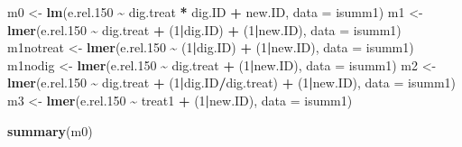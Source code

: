 \documentclass[
]{article}
\newenvironment{Shaded}{\begin{snugshade}}{\end{snugshade}}
\newcommand{\AttributeTok}[1]{\textcolor[rgb]{0.13,0.29,0.53}{#1}}
\newcommand{\DecValTok}[1]{\textcolor[rgb]{0.00,0.00,0.81}{#1}}
\newcommand{\FloatTok}[1]{\textcolor[rgb]{0.00,0.00,0.81}{#1}}
\newcommand{\FunctionTok}[1]{\textcolor[rgb]{0.13,0.29,0.53}{\textbf{#1}}}
\newcommand{\NormalTok}[1]{#1}
\newcommand{\OtherTok}[1]{\textcolor[rgb]{0.56,0.35,0.01}{#1}}
\newcommand{\SpecialCharTok}[1]{\textcolor[rgb]{0.81,0.36,0.00}{\textbf{#1}}}
\begin{document}
\begin{Shaded}
\begin{Highlighting}[]
\NormalTok{m0 }\OtherTok{\textless{}{-}} \FunctionTok{lm}\NormalTok{(e.rel}\FloatTok{.150} \SpecialCharTok{\textasciitilde{}}\NormalTok{ dig.treat }\SpecialCharTok{*}\NormalTok{ dig.ID }\SpecialCharTok{+}\NormalTok{ new.ID, }\AttributeTok{data =}\NormalTok{ isumm1)}
\NormalTok{m1 }\OtherTok{\textless{}{-}} \FunctionTok{lmer}\NormalTok{(e.rel}\FloatTok{.150} \SpecialCharTok{\textasciitilde{}}\NormalTok{ dig.treat }\SpecialCharTok{+}\NormalTok{ (}\DecValTok{1}\SpecialCharTok{|}\NormalTok{dig.ID) }\SpecialCharTok{+}\NormalTok{ (}\DecValTok{1}\SpecialCharTok{|}\NormalTok{new.ID), }\AttributeTok{data =}\NormalTok{ isumm1)}
\NormalTok{m1notreat }\OtherTok{\textless{}{-}} \FunctionTok{lmer}\NormalTok{(e.rel}\FloatTok{.150} \SpecialCharTok{\textasciitilde{}}\NormalTok{ (}\DecValTok{1}\SpecialCharTok{|}\NormalTok{dig.ID) }\SpecialCharTok{+}\NormalTok{ (}\DecValTok{1}\SpecialCharTok{|}\NormalTok{new.ID), }\AttributeTok{data =}\NormalTok{ isumm1)}
\NormalTok{m1nodig }\OtherTok{\textless{}{-}} \FunctionTok{lmer}\NormalTok{(e.rel}\FloatTok{.150} \SpecialCharTok{\textasciitilde{}}\NormalTok{ dig.treat }\SpecialCharTok{+}\NormalTok{ (}\DecValTok{1}\SpecialCharTok{|}\NormalTok{new.ID), }\AttributeTok{data =}\NormalTok{ isumm1)}
\NormalTok{m2 }\OtherTok{\textless{}{-}} \FunctionTok{lmer}\NormalTok{(e.rel}\FloatTok{.150} \SpecialCharTok{\textasciitilde{}}\NormalTok{ dig.treat }\SpecialCharTok{+}\NormalTok{ (}\DecValTok{1}\SpecialCharTok{|}\NormalTok{dig.ID}\SpecialCharTok{/}\NormalTok{dig.treat) }\SpecialCharTok{+}\NormalTok{ (}\DecValTok{1}\SpecialCharTok{|}\NormalTok{new.ID), }\AttributeTok{data =}\NormalTok{ isumm1)}
\NormalTok{m3 }\OtherTok{\textless{}{-}} \FunctionTok{lmer}\NormalTok{(e.rel}\FloatTok{.150} \SpecialCharTok{\textasciitilde{}}\NormalTok{ treat1 }\SpecialCharTok{+}\NormalTok{ (}\DecValTok{1}\SpecialCharTok{|}\NormalTok{new.ID), }\AttributeTok{data =}\NormalTok{ isumm1)}
\end{Highlighting}
\end{Shaded}

\begin{Shaded}
\begin{Highlighting}[]
\FunctionTok{summary}\NormalTok{(m0)}
\end{Highlighting}
\end{Shaded}
\end{document}
